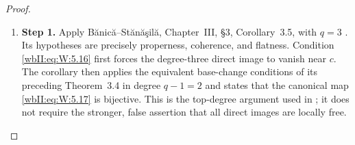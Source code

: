 \begin{proof}
\begin{enumerate}[label={$\langle1\rangle$\arabic*.},leftmargin=*]
\item 
\noindent\textbf{Step 1.} Apply B\u{a}nic\u{a}--St\u{a}n\u{a}\c{s}il\u{a},
Chapter~III, \S3, Corollary~3.5, with $q=3$
\cite[pp.~120--121]{BS76push}.  Its hypotheses are precisely
properness, coherence, and flatness.  Condition \eqref{wbII:eq:W:5.16} first forces the
degree-three direct image to vanish near $c$.  The corollary then applies the
equivalent base-change conditions of its preceding Theorem~3.4 in degree
$q-1=2$ and states that the canonical map \eqref{wbII:eq:W:5.17} is bijective.  This is the
top-degree argument used in \cite[Lemma~1.5]{CDP98}; it does not require
the stronger, false assertion that all direct images are locally free.

\end{enumerate}
\end{proof}
